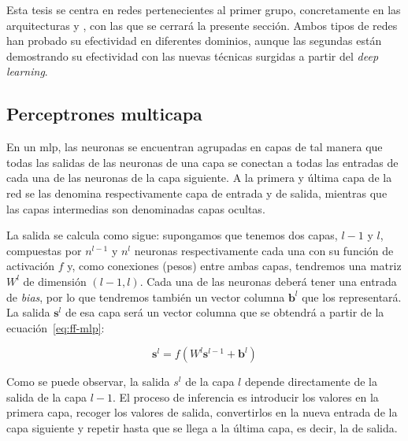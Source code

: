 Esta tesis se centra en redes pertenecientes al primer grupo, concretamente en las arquitecturas  y  , con las que se cerrará la presente sección. Ambos tipos de redes han probado su efectividad en diferentes dominios, aunque las segundas están demostrando su efectividad con las nuevas técnicas surgidas a partir del \textit{deep learning}.

\subsection{Perceptrones multicapa}
\label{ss:mlp}

En un \Acrfull{mlp}, las neuronas se encuentran agrupadas en capas de tal manera que todas las salidas de las neuronas de una capa se conectan a todas las entradas de cada una de las neuronas de la capa siguiente. A la primera y última capa de la red se las denomina respectivamente capa de entrada y de salida, mientras que las capas intermedias son denominadas capas ocultas.

La salida se calcula como sigue: supongamos que tenemos dos capas, $l-1$ y $l$, compuestas por $n^{l-1}$ y $n^l$ neuronas respectivamente cada una con su función de activación $f$ y, como conexiones (pesos) entre ambas capas, tendremos una matriz $W^l$ de dimensión $(l-1, l)$. Cada una de las neuronas deberá tener una entrada de \textit{bias}, por lo que tendremos también un vector columna $\mathbf{b}^l$ que los representará. La salida $\mathbf{s}^l$ de esa capa será un vector columna que se obtendrá a partir de la ecuación~\ref{eq:ff-mlp}:

\begin{equation}
	\mathbf{s}^l = f(W^l \mathbf{s}^{l-1} + \mathbf{b}^l)
	\label{eq:ff-mlp}
\end{equation}

Como se puede observar, la salida $s^l$ de la capa $l$ depende directamente de la salida de la capa $l - 1$. El proceso de inferencia es introducir los valores en la primera capa, recoger los valores de salida, convertirlos en la nueva entrada de la capa siguiente y repetir hasta que se llega a la última capa, es decir, la de salida.


